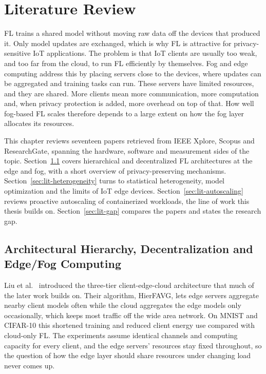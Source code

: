 \chapter{Literature Review}\label{chap:LiteratureReview}

\Ac{FL} trains a shared model without moving raw data off the devices that produced it. Only model updates are exchanged, which is why \ac{FL} is attractive for privacy-sensitive \ac{IoT} applications. The problem is that \ac{IoT} clients are usually too weak, and too far from the cloud, to run \ac{FL} efficiently by themselves. Fog and edge computing address this by placing servers close to the devices, where updates can be aggregated and training tasks can run. These servers have limited resources, and they are shared. More clients mean more communication, more computation and, when privacy protection is added, more overhead on top of that. How well fog-based \ac{FL} scales therefore depends to a large extent on how the fog layer allocates its resources.

This chapter reviews seventeen papers retrieved from IEEE Xplore, Scopus and ResearchGate, spanning the hardware, software and measurement sides of the topic. Section~\ref{sec:lit-architecture} covers hierarchical and decentralized \ac{FL} architectures at the edge and fog, with a short overview of privacy-preserving mechanisms. Section~\ref{sec:lit-heterogeneity} turns to statistical heterogeneity, model optimization and the limits of \ac{IoT} edge devices. Section~\ref{sec:lit-autoscaling} reviews proactive autoscaling of containerized workloads, the line of work this thesis builds on. Section~\ref{sec:lit-gap} compares the papers and states the research gap.

\section{Architectural Hierarchy, Decentralization and Edge/Fog Computing}\label{sec:lit-architecture}

Liu et al.~\cite{liu2020client} introduced the three-tier client-edge-cloud architecture that much of the later work builds on. Their algorithm, \ac{HierFAVG}, lets edge servers aggregate nearby client models often while the cloud aggregates the edge models only occasionally, which keeps most traffic off the wide area network. On MNIST and CIFAR-10 this shortened training and reduced client energy use compared with cloud-only \ac{FL}. The experiments assume identical channels and computing capacity for every client, and the edge servers' resources stay fixed throughout, so the question of how the edge layer should share resources under changing load never comes up.

